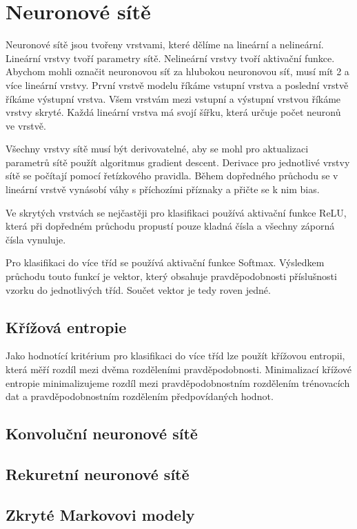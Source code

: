 \documentclass[FM,BP]{tulthesis}
\begin{document}
\section{Neuronové sítě}
Neuronové sítě jsou tvořeny vrstvami, které dělíme na lineární a nelineární. Lineární vrstvy tvoří parametry sítě. Nelineární vrstvy tvoří aktivační funkce. Abychom mohli označit neuronovou síť za hlubokou neuronovou síť, musí mít 2 a více lineární vrstvy. První vrstvě modelu říkáme vstupní vrstva a poslední vrstvě říkáme výstupní vrstva. Všem vrstvám mezi vstupní a výstupní vrstvou říkáme vrstvy skryté. Každá lineární vrstva má svojí šířku, která určuje počet neuronů ve vrstvě.

Všechny vrstvy sítě musí být derivovatelné, aby se mohl pro aktualizaci parametrů sítě použít algoritmus gradient descent. Derivace pro jednotlivé vrstvy sítě se počítají pomocí řetízkového pravidla. Během dopředného průchodu se v lineární vrstvě vynásobí váhy s příchozími příznaky a přičte se k nim bias.

Ve skrytých vrstvách se nejčastěji pro klasifikaci používá aktivační funkce ReLU, která při dopředném průchodu propustí pouze kladná čísla a všechny záporná čísla vynuluje.

Pro klasifikaci do více tříd se používá aktivační funkce Softmax. Výsledkem průchodu touto funkcí je vektor, který obsahuje pravděpodobnosti příslušnosti vzorku do jednotlivých tříd. Součet vektor je tedy roven jedné.

\subsection{Křížová entropie}
Jako hodnotící kritérium pro klasifikaci do více tříd lze použít křížovou entropii, která měří rozdíl mezi dvěma rozděleními pravděpodobnosti. Minimalizací křížové entropie minimalizujeme rozdíl mezi pravděpodobnostním rozdělením trénovacích dat a pravděpodobnostním rozdělením předpovídaných hodnot.\cite{brownlee_2020}

\subsection{Konvoluční neuronové sítě}
\subsection{Rekuretní neuronové sítě}
\subsection{Zkryté Markovovi modely}
\end{document}
